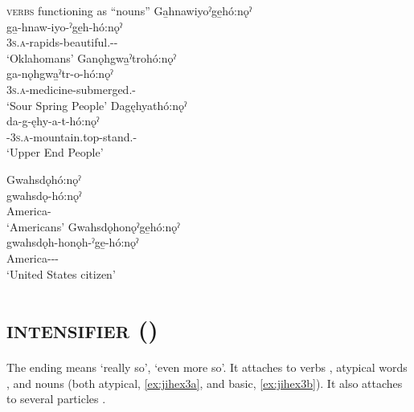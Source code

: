 \ea\label{ex:honex2} \textsc{verbs} functioning as “nouns”
\ea Ga̱hnawiyoˀge̱hó:nǫˀ\\
\gll ga̱-hnaw-iyo-ˀge̱h-hó:nǫˀ\\
 \textsc{3s.a}-rapids-beautiful.{\stative}-{\on}-{\populative}\\
\glt `Oklahomans'
\ex Ganǫhgwa̱ˀtrohó:nǫˀ\\
\gll ga-nǫhgwa̱ˀtr-o-hó:nǫˀ\\
 \textsc{3s.a}-medicine-submerged.{\stative}-{\populative}\\
\glt `Sour Spring People'
\ex Dagęhyathó:nǫˀ\\
\gll da-g-ęhy-a-t-hó:nǫˀ\\
 {\cislocative}-\textsc{3s.a}-mountain.top-stand.{\stative}-{\populative}\\
\glt `Upper End People'
\newpage
{}
\z
\z

\ea\label{ex:honex4}
\ea Gwahsdǫhó:nǫˀ\\
\gll gwahsdǫ-hó:nǫˀ\\
 America-{\populative}\footnotemark{}\\
\glt `Americans'
\ex Gwahsdǫhonǫˀge̱hó:nǫˀ\\
\gll gwahsdǫh-honǫh-ˀge̱-hó:nǫˀ\\
 America-{\populative}-{\on}-{\populative}\\
\glt `United States citizen'
\z
\z

\section{ \textsc{intensifier} \textup{(}{\intensifier}\textup{)}} \label{-jih}
The  \textsc{\intensifier} ending means ‘really so’, ‘even more so’. It attaches to verbs , atypical words , and nouns (both atypical, \ref{ex:jihex3a}, and basic, \ref{ex:jihex3b}). It also attaches to several particles .
 

